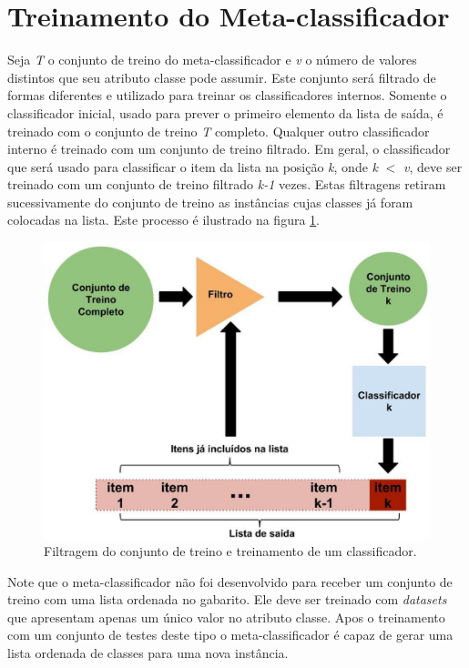 \section{Treinamento do Meta-classificador}

Seja \textit{T} o conjunto de treino do meta-classificador e \textit{v} o número de valores distintos que seu atributo classe pode assumir. Este conjunto será filtrado de formas diferentes e utilizado para treinar os classificadores internos. Somente o classificador inicial, usado para prever o primeiro elemento da lista de saída, é treinado com o conjunto de treino \textit{T} completo. Qualquer outro classificador interno é treinado com um conjunto de treino filtrado. Em geral, o classificador que será usado para classificar o item da lista na posição \textit{k}, onde \textit{k} $<$ \textit{v}, deve ser treinado com um conjunto de treino filtrado \textit{k-1} vezes. Estas filtragens retiram sucessivamente do conjunto de treino as instâncias cujas classes já foram colocadas na lista. Este processo é ilustrado na figura \ref{fig:metodoproposto02}.

\begin{figure}[h!]
  \includegraphics[width=\linewidth]{images/metodoproposto02.eps}
  \caption{Filtragem do conjunto de treino e treinamento de um classificador.}
  \label{fig:metodoproposto02}
\end{figure}


Note que o meta-classificador não foi desenvolvido para receber um conjunto de treino com uma lista ordenada no gabarito. 
Ele deve ser treinado com \textit{datasets} que apresentam apenas um único valor no atributo classe.
Apos o treinamento com um conjunto de testes deste tipo o meta-classificador é capaz de gerar uma lista ordenada de classes para uma nova instância.

